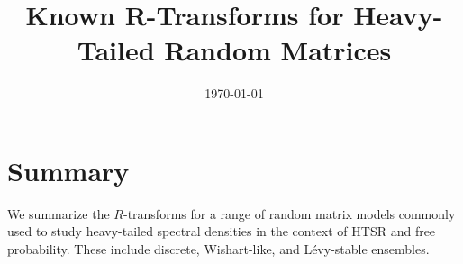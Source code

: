 \documentclass[12pt]{article}
\title{Known R-Transforms for Heavy-Tailed Random Matrices}
\date{\today}
\begin{document}
\maketitle

\section*{Summary}
We summarize the $R$-transforms for a range of random matrix models commonly used to study heavy-tailed spectral densities in the context of HTSR and free probability. These include discrete, Wishart-like, and Lévy-stable ensembles.


\end{document}
